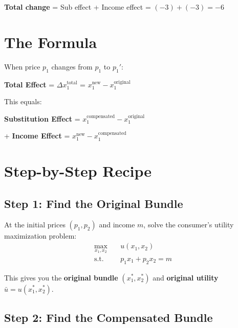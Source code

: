 \documentclass[12pt]{article}
\begin{document}
\textbf{Total change} = \textcolor{subcolor}{Sub effect} + \textcolor{incomecolor}{Income effect} = $(-3) + (-3) = -6$

\section{The Formula}

\begin{tcolorbox}[colback=green!5!white,colframe=green!75!black,title=Slutsky Decomposition]
When price $p_1$ changes from $p_1$ to $p_1'$:

\vspace{0.3cm}

\textbf{Total Effect} = \textcolor{totalcolor}{$\Delta x_1^{\text{total}}$} = $x_1^{\text{new}} - x_1^{\text{original}}$

\vspace{0.2cm}

This equals:

\vspace{0.2cm}

\textcolor{subcolor}{\textbf{Substitution Effect}} = $x_1^{\text{compensated}} - x_1^{\text{original}}$

\quad + \textcolor{incomecolor}{\textbf{Income Effect}} = $x_1^{\text{new}} - x_1^{\text{compensated}}$
\end{tcolorbox}

\section{Step-by-Step Recipe}

\subsection*{Step 1: Find the Original Bundle}

At the initial prices $(p_1, p_2)$ and income $m$, solve the consumer's utility maximization problem:
\begin{align*}
\max_{x_1, x_2} \quad & u(x_1, x_2) \\
\text{s.t.} \quad & p_1 x_1 + p_2 x_2 = m
\end{align*}

This gives you the \textbf{original bundle} $(x_1^*, x_2^*)$ and \textbf{original utility} $\bar{u} = u(x_1^*, x_2^*)$.

\subsection*{Step 2: Find the Compensated Bundle}
\end{document}
